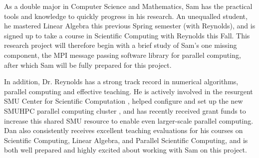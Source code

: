 \documentclass[final]{siamltex}
\renewcommand{\(}{\left(}
\renewcommand{\)}{\right)}
\begin{document}
As a double major in Computer Science and Mathematics, Sam has the
practical tools and knowledge to quickly progress in his research.  An
unequalled student, he mastered Linear Algebra this previous Spring
semester (with Reynolds), and is signed up to take a course in
Scientific Computing with Reynolds this Fall.  This research project
will therefore begin with a brief study of Sam's one missing
component, the MPI message passing software library for parallel
computing, after which Sam will be fully prepared for this project.

In addition, Dr. Reynolds has a strong track record in numerical
algorithms, parallel computing and effective teaching.  He is actively
involved in the resurgent SMU Center for Scientific Computation
\cite{smucsc_site}, helped configure and set up the new SMUHPC
parallel computing cluster \cite{smuhpc_site}, and has recently
received grant funds to increase this shared SMU resource to enable
even larger-scale parallel computing.  Dan also consistently receives
excellent teaching evaluations for his courses on Scientific
Computing, Linear Algebra, and Parallel Scientific Computing, and is
both well prepared and highly excited about working with Sam on
this project. 







\end{document}
